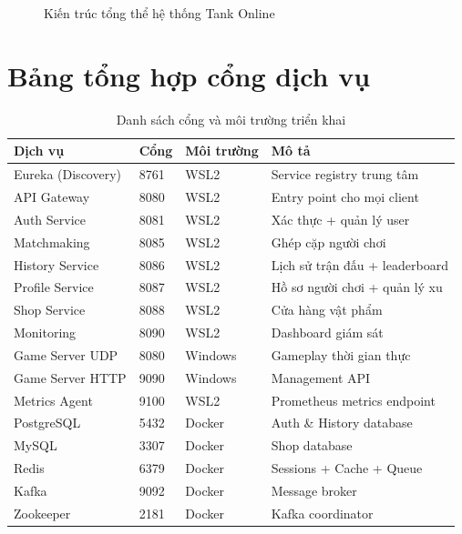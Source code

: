\documentclass[12pt,a4paper]{report}
\begin{document}
\begin{figure}[!ht]
\caption{Kiến trúc tổng thể hệ thống Tank Online}
\label{fig:arch}
\end{figure}

\section{Bảng tổng hợp cổng dịch vụ}

\begin{table}[H]
\centering
\caption{Danh sách cổng và môi trường triển khai}
\label{tab:ports}
\begin{tabularx}{\textwidth}{lllX}
\toprule
\textbf{Dịch vụ} & \textbf{Cổng} & \textbf{Môi trường} & \textbf{Mô tả} \\
\midrule
Eureka (Discovery) & 8761 & WSL2    & Service registry trung tâm \\
API Gateway        & 8080 & WSL2    & Entry point cho mọi client \\
Auth Service       & 8081 & WSL2    & Xác thực + quản lý user \\
Matchmaking        & 8085 & WSL2    & Ghép cặp người chơi \\
History Service    & 8086 & WSL2    & Lịch sử trận đấu + leaderboard \\
Profile Service    & 8087 & WSL2    & Hồ sơ người chơi + quản lý xu \\
Shop Service       & 8088 & WSL2    & Cửa hàng vật phẩm \\
Monitoring         & 8090 & WSL2    & Dashboard giám sát \\
Game Server UDP    & 8080 & Windows & Gameplay thời gian thực \\
Game Server HTTP   & 9090 & Windows & Management API \\
Metrics Agent      & 9100 & WSL2    & Prometheus metrics endpoint \\
PostgreSQL         & 5432 & Docker  & Auth \& History database \\
MySQL              & 3307 & Docker  & Shop database \\
Redis              & 6379 & Docker  & Sessions + Cache + Queue \\
Kafka              & 9092 & Docker  & Message broker \\
Zookeeper          & 2181 & Docker  & Kafka coordinator \\
\bottomrule
\end{tabularx}
\end{table}
\end{document}
